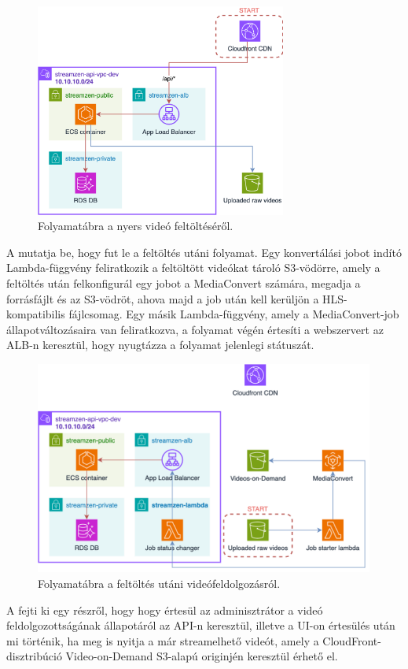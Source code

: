 \begin{figure}
	\centering
	\includegraphics[height=70mm, keepaspectratio]{figures/dipterv_vod1.png}
	\caption{Folyamatábra a nyers videó feltöltéséről.}
	\label{fig:vod1}
\end{figure}

A  mutatja be, hogy fut le a feltöltés utáni folyamat. Egy konvertálási jobot indító Lambda-függvény feliratkozik a feltöltött videókat tároló S3-vödörre, amely a feltöltés után felkonfigurál egy jobot a MediaConvert számára, megadja a forrásfájlt és az S3-vödröt, ahova majd a job után kell kerüljön a HLS-kompatibilis fájlcsomag. Egy másik Lambda-függvény, amely a MediaConvert-job állapotváltozásaira van feliratkozva, a folyamat végén értesíti a webszervert az ALB-n keresztül, hogy nyugtázza a folyamat jelenlegi státuszát.

\begin{figure}
	\centering
	\includegraphics[height=70mm, keepaspectratio]{figures/dipterv_vod2.png}
	\caption{Folyamatábra a feltöltés utáni videófeldolgozásról.}
	\label{fig:vod2}
\end{figure}

A  fejti ki egy részről, hogy hogy értesül az adminisztrátor a videó feldolgozottságának állapotáról az API-n keresztül, illetve a UI-on értesülés után mi történik, ha meg is nyitja a már streamelhető videót, amely a CloudFront-disztribúció Video-on-Demand S3-alapú originjén keresztül érhető el.

